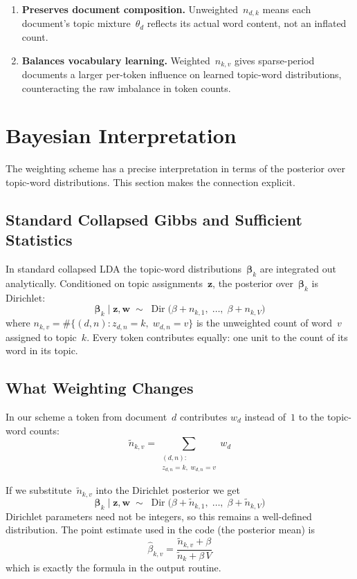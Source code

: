 \documentclass[11pt]{article}
\begin{document}
\begin{enumerate}
\item \textbf{Preserves document composition.}
Unweighted~$n_{d,k}$ means each document's topic mixture~$\theta_d$ reflects its actual word content, not an inflated count.

\item \textbf{Balances vocabulary learning.}
Weighted~$n_{k,v}$ gives sparse-period documents a larger per-token influence on learned topic-word distributions, counteracting the raw imbalance in token counts.
\end{enumerate}

\section{Bayesian Interpretation}

The weighting scheme has a precise interpretation in terms of the posterior over topic-word distributions.
This section makes the connection explicit.

\subsection{Standard Collapsed Gibbs and Sufficient Statistics}

In standard collapsed LDA the topic-word distributions~$\boldsymbol\beta_k$ are integrated out analytically.
Conditioned on topic assignments~$\mathbf z$, the posterior over~$\boldsymbol\beta_k$ is Dirichlet:
\[
\boldsymbol\beta_k \mid \mathbf z, \mathbf w
  \;\sim\;
  \operatorname{Dir}\!\bigl(\beta + n_{k,1},\;\ldots,\;\beta + n_{k,V}\bigr)
\]
where $n_{k,v} = \#\{(d,n) : z_{d,n}=k,\; w_{d,n}=v\}$ is the unweighted count of word~$v$ assigned to topic~$k$.
Every token contributes equally: one unit to the count of its word in its topic.

\subsection{What Weighting Changes}

In our scheme a token from document~$d$ contributes $w_d$ instead of~$1$ to the topic-word counts:
\[
\tilde n_{k,v}
  = \sum_{\substack{(d,n):\\z_{d,n}=k,\;w_{d,n}=v}} w_d
\]

If we substitute~$\tilde n_{k,v}$ into the Dirichlet posterior we get
\[
\boldsymbol\beta_k \mid \mathbf z, \mathbf w
  \;\sim\;
  \operatorname{Dir}\!\bigl(\beta + \tilde n_{k,1},\;\ldots,\;\beta + \tilde n_{k,V}\bigr)
\]
Dirichlet parameters need not be integers, so this remains a well-defined distribution.
The point estimate used in the code (the posterior mean) is
\[
\hat\beta_{k,v}
  = \frac{\tilde n_{k,v} + \beta}{\tilde n_k + \beta\,V}
\]
which is exactly the formula in the output routine.
\end{document}

